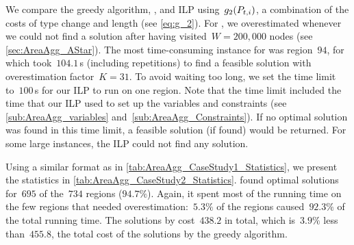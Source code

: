 We compare the greedy algorithm, \Astar, and ILP
using~$g_2(P_{t,i})$,
a combination of the costs 
of type change and length (see \eq\ref{eq:g_2}).
For \Astar, we overestimated 
whenever we could not find a solution after 
having visited~$W=200{,}000$ nodes 
(see \sect\ref{sec:AreaAgg_AStar}).
The most time-consuming instance for \Astar was region~$94$,
for which \Astar took~$104.1\,$s (including repetitions)
to find a feasible solution 
with overestimation factor~$K=31$.
To avoid waiting too long,
we set the time limit to~$100\,$s 
for our ILP to run on one region.
Note that the time limit included
the time that our ILP used 
to set up the variables and constraints
(see \sects\ref{sub:AreaAgg_variables} 
and~\ref{sub:AreaAgg_Constraints}).
If no optimal solution was found in this time limit,
a feasible solution (if found) would be returned.
For some large instances, 
the ILP could not find any solution.

Using a similar format as in 
\tab\ref{tab:AreaAgg_CaseStudy1_Statistics},
we present the statistics in 
\tab\ref{tab:AreaAgg_CaseStudy2_Statistics}.
\Astar found optimal solutions 
for~$695$ of the~$734$ regions ($94.7\%$).
Again, it spent most of the running time 
on the few regions that needed 
overestimation:~$5.3\%$ of the regions 
caused~$92.3\%$ of the total running time.
The solutions by \Astar cost~$438.2$ in total, 
which is~$3.9\%$ less than~$455.8$, 
the total cost of the solutions by the greedy algorithm.

